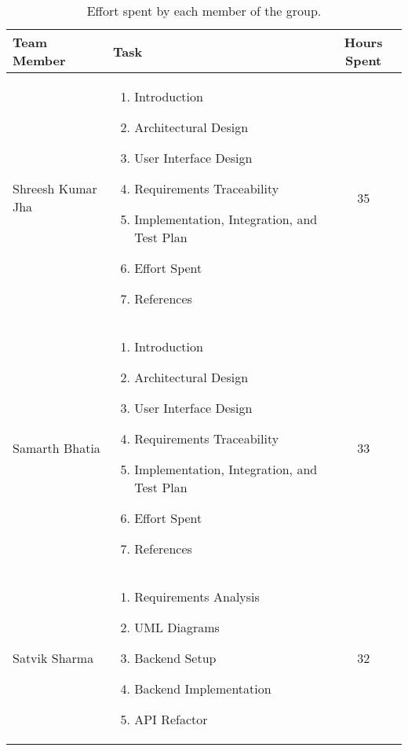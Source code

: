\begin{table}[H]
    \centering
    \begin{tabular}{|p{}|p{}|c|}
        \hline
        \textbf{Team Member} & \textbf{Task} & \textbf{Hours Spent} \\ 
        \hline
        Shreesh Kumar Jha & 
        \begin{enumerate}
            \item Introduction
            \item Architectural Design
            \item User Interface Design
            \item Requirements Traceability
            \item Implementation, Integration, and Test Plan
            \item Effort Spent
            \item References
        \end{enumerate} & 35 \\ 
        \hline
        Samarth Bhatia & 
        \begin{enumerate}
            \item Introduction
            \item Architectural Design
            \item User Interface Design
            \item Requirements Traceability
            \item Implementation, Integration, and Test Plan
            \item Effort Spent
            \item References
        \end{enumerate} & 33 \\ 
        \hline
        Satvik Sharma & 
        \begin{enumerate}
            \item Requirements Analysis
            \item UML Diagrams
            \item Backend Setup
            \item Backend Implementation
            \item API Refactor
        \end{enumerate} & 32 \\ 
        \hline
    \end{tabular}
    \caption{Effort spent by each member of the group.}
    \label{tab:effort_spent}
\end{table}
